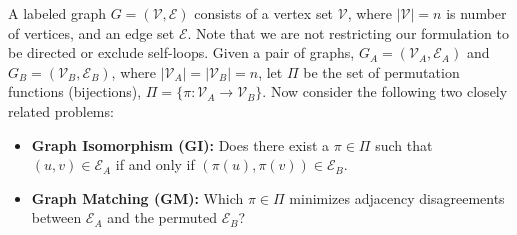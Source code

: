 \documentclass[11pt]{article}
\newcommand{\from}{{\ensuremath{\colon}}}           %
\providecommand{\mc}[1]{\mathcal{#1}}
\begin{document}
A labeled graph $G=(\mc{V},\mc{E})$ consists of a vertex set $\mc{V}$, where $|\mc{V}|=n$ is number of vertices, and an edge set $\mc{E}$. %
Note that we are not restricting our formulation to be directed or exclude self-loops. Given a pair of graphs, $G_A=(\mc{V}_A,\mc{E}_A)$ and $G_B=(\mc{V}_B,\mc{E}_B)$, where $|\mc{V}_A|=|\mc{V}_B|=n$, 
let $\Pi$ be the set of permutation functions (bijections), $\Pi=\{\pi \from \mc{V}_A \to \mc{V}_B\}$.
Now consider the following two closely related problems:
\begin{itemize}
	\item \textbf{Graph Isomorphism (GI):}  Does there exist a $\pi \in \Pi$ such that $(u,v) \in \mc{E}_A$ if and only if $(\pi(u),\pi(v)) \in \mc{E}_B$. 
		\item \textbf{Graph Matching (GM):}
		 Which $\pi \in \Pi$ minimizes adjacency disagreements between $\mc{E}_A$ and the permuted $\mc{E}_B$?
\end{itemize}
\end{document}
